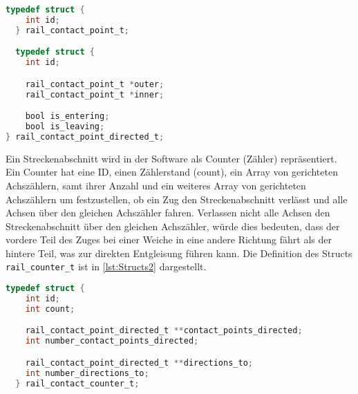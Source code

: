 \begin{lstlisting}[caption={Definition der Structs},label={lst:Structs},language=C]
  typedef struct {
    int id;
  } rail_contact_point_t;

  typedef struct {
    int id;

    rail_contact_point_t *outer;
    rail_contact_point_t *inner;

    bool is_entering;
    bool is_leaving;
} rail_contact_point_directed_t;
\end{lstlisting}

Ein Streckenabschnitt wird in der Software als Counter (Zähler) repräsentiert. Ein Counter hat eine ID, einen Zählerstand (count), ein Array von gerichteten Achszählern, samt ihrer Anzahl und ein weiteres Array von gerichteten Achszählern um festzustellen, ob ein Zug den Streckenabschnitt verlässt und alle Achsen über den gleichen Achszähler fahren. Verlassen nicht alle Achsen den Streckenabschnitt über den gleichen Achszähler, würde dies bedeuten, dass der vordere Teil des Zuges bei einer Weiche in eine andere Richtung fährt als der hintere Teil, was zur direkten Entgleisung führen kann. Die Definition des Structs \texttt{rail\_counter\_t} ist in \autoref{lst:Structs2} dargestellt.

\begin{lstlisting}[caption={Definition des Structs rail\_counter\_t},label={lst:Structs2},language=C]
  typedef struct {
    int id;
    int count;

    rail_contact_point_directed_t **contact_points_directed;
    int number_contact_points_directed;

    rail_contact_point_directed_t **directions_to;
    int number_directions_to;
  } rail_contact_counter_t;
\end{lstlisting}

